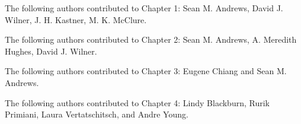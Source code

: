 
{\large
\linespread{1.}\selectfont{}
\noindent The following authors contributed to Chapter 1: \newline
Sean M. Andrews, David J. Wilner, J. H. Kastner, M. K. McClure.

\noindent The following authors contributed to Chapter 2: \newline
Sean M. Andrews, A. Meredith Hughes, David J. Wilner.

\noindent The following authors contributed to Chapter 3: \newline
Eugene Chiang and Sean M. Andrews.

\noindent The following authors contributed to Chapter 4: \newline
Lindy Blackburn, Rurik Primiani, Laura Vertatschitsch, and Andre Young.
}

